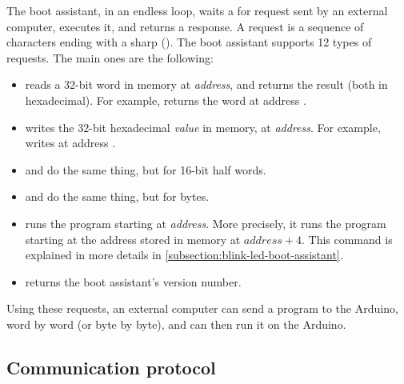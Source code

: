 The boot assistant, in an endless loop, waits a for request sent by an external
computer, executes it, and returns a response. A request is a sequence of
characters ending with a sharp (\code{\#}). The boot assistant supports 12
types of requests. The main ones are the following:
\begin{itemize}
  \item {}\code{,\#} reads a 32-bit word in memory at
  {\em address}, and returns the result (both in hexadecimal). For
  example,
   returns the word at address .

  \item {}\code{\#} writes the 32-bit
  hexadecimal {\em value} in memory, at {\em address}. For example,
   writes  at address .

  \item {}\code{,\#} and \code{\#} do the same thing, but for 16-bit half words.

  \item {}\code{,\#} and \code{\#} do the same thing, but for bytes.

  \item {}\code{\#} runs the program starting at {\em
  address}. More precisely, it runs the program starting at the address stored
  in memory at $address+4$. This command is explained in more details in
  \cref{subsection:blink-led-boot-assistant}.

  \item {} returns the boot assistant's version number.
\end{itemize}

Using these requests, an external computer can send a program to the Arduino,
word by word (or byte by byte), and can then run it on the Arduino.

\subsection{Communication protocol}

